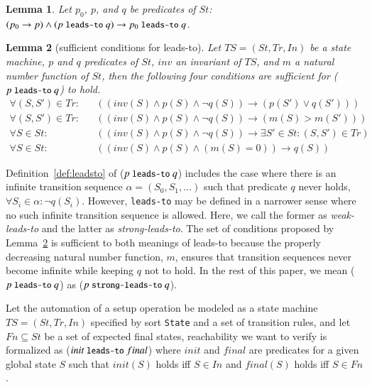 \documentclass[12pt]{report}
\newtheorem{lemma}{Lemma}
\newcommand{\ra}{\rightarrow}
\newcommand{\mbstt}[1]{\mbox{\small{\tt {#1}}}}
\newcommand{\stt}[1]{{\small{\tt {#1}}}}
\begin{document}
\begin{lemma}
\label{def:p0leadstoq}
  Let $p_0$, $p$, and $q$ be predicates of $\mathit{St}$:
  $(p_0 \ra p) \land (p~\mbstt{leads-to}~q) \ra
  p_0~\mbstt{leads-to}~q$.
\end{lemma}

\begin{lemma}[sufficient conditions for leads-to]
\label{def:sufcond}
  Let $TS=(\mathit{St},\mathit{Tr},In)$ be a state machine, $p$ and $q$ predicates of
  $\mathit{St}$, $inv$ an invariant of $TS$, and $m$ a natural number
  function of $\mathit{St}$, then the following four conditions are sufficient
  for ($p~\mbstt{leads-to}~q$) to hold.
\begin{eqnarray*}
\forall (S,S')\in \mathit{Tr}:&&((inv(S)\land p(S)\land\neg q(S))\ra(p(S')\lor q(S')))\\
\forall (S,S')\in \mathit{Tr}:&&((inv(S)\land p(S)\land\neg q(S))\ra(m(S) > m(S')))\\
\forall S\in \mathit{St}:&&((inv(S)\land p(S)\land\neg q(S))\ra\exists S'\in \mathit{St}:(S,S')\in \mathit{Tr})\\
\forall S\in \mathit{St}:&&((inv(S)\land p(S)\land(m(S) = 0)) \ra q(S))
\end{eqnarray*}
\end{lemma}
Definition~\ref{def:leadsto} of ($p~\mbstt{leads-to}~q$) includes the
case where there is an infinite transition sequence
$\alpha=(\mathit{S_0},\mathit{S_1},\dots)$ such that predicate $q$ never holds,
$\forall \mathit{S_i}\in\alpha:\neg q(\mathit{S_i})$. However, \stt{leads-to} may be
defined in a narrower sense where no such infinite transition sequence
is allowed. Here, we call the former as {\it weak-leads-to} and the
latter as {\it strong-leads-to}. The set of conditions proposed by
Lemma~\ref{def:sufcond} is sufficient to both meanings of leads-to
because the properly decreasing natural number function, $m$, ensures
that transition sequences never become infinite while keeping $q$ not
to hold. In the rest of this paper, we mean ($p~\mbstt{leads-to}~q$)
as ($p~\mbstt{strong-leads-to}~q$).

Let the automation of a setup operation be modeled as a state machine
$TS=(\mathit{St},\mathit{Tr},In)$ specified by sort {\tt State} and a set of transition
rules, and let
$Fn\subseteq \mathit{St}$ be a set of expected final states, reachability
we want to verify is formalized as ($init~\mbstt{leads-to}~final$) where
$init$ and $final$ are predicates for a given global state $S$ such
that $init(S)$ holds iff $S \in In$ and $final(S)$ holds iff $S \in
Fn$. 
\end{document}
